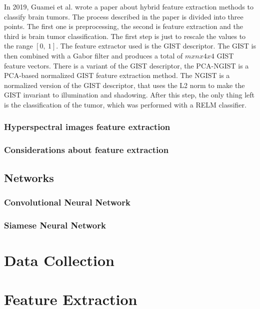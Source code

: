 \documentclass[conference]{IEEEtran}
\begin{document}
			\noindent In 2019, Guamei et al. wrote a paper about hybrid feature extraction methods to classify brain tumors. The process described in the paper is divided into three points. The 
			first one is preprocessing, the second is feature extraction and the third is brain tumor classification. The first step is just to rescale the values to the range $[0,\ 1]$. The feature extractor 
			used is the GIST descriptor. The GIST is then combined with a Gabor filter and produces a total of $mxnx4x4$ GIST feature vectors. There is a variant of the GIST descriptor, the 
			PCA-NGIST is a PCA-based normalized GIST feature extraction method. The NGIST is a normalized version of the GIST descriptor, that uses the L2 norm to make the GIST invariant to illumination and shadowing. 
			After this step, the only thing left is the classification of the tumor, which was performed with a RELM classifier. 
			
		\subsubsection{Hyperspectral images feature extraction}
			


		\subsubsection{Considerations about feature extraction}
		
		
		\subsection{Networks}
		
		\subsubsection{Convolutional Neural Network}
		
		\subsubsection{Siamese Neural Network}


\section{Data Collection}
\section{Feature Extraction}
\end{document}
